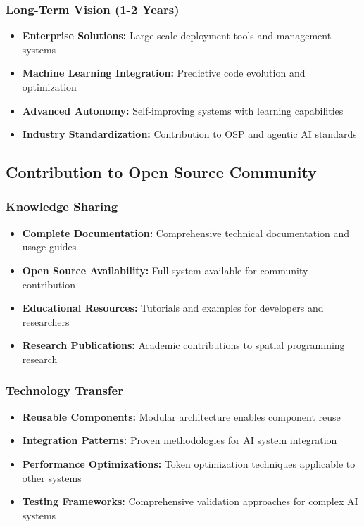\documentclass[12pt,a4paper]{article}
\begin{document}
\subsubsection{Long-Term Vision (1-2 Years)}
\begin{itemize}
    \item \textbf{Enterprise Solutions:} Large-scale deployment tools and management systems
    \item \textbf{Machine Learning Integration:} Predictive code evolution and optimization
    \item \textbf{Advanced Autonomy:} Self-improving systems with learning capabilities
    \item \textbf{Industry Standardization:} Contribution to OSP and agentic AI standards
\end{itemize}

\subsection{Contribution to Open Source Community}

\subsubsection{Knowledge Sharing}
\begin{itemize}
    \item \textbf{Complete Documentation:} Comprehensive technical documentation and usage guides
    \item \textbf{Open Source Availability:} Full system available for community contribution
    \item \textbf{Educational Resources:} Tutorials and examples for developers and researchers
    \item \textbf{Research Publications:} Academic contributions to spatial programming research
\end{itemize}

\subsubsection{Technology Transfer}
\begin{itemize}
    \item \textbf{Reusable Components:} Modular architecture enables component reuse
    \item \textbf{Integration Patterns:} Proven methodologies for AI system integration
    \item \textbf{Performance Optimizations:} Token optimization techniques applicable to other systems
    \item \textbf{Testing Frameworks:} Comprehensive validation approaches for complex AI systems
\end{itemize}
\end{document}
